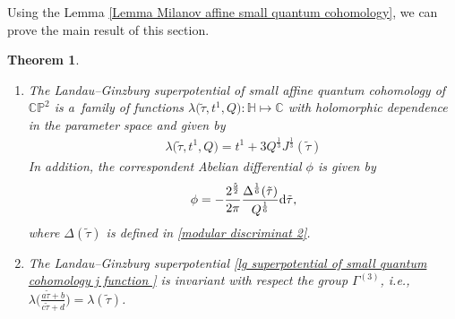 \documentclass[pdftex]{sigma}
\numberwithin{equation}{section}
\newtheorem{Theorem}{Theorem}[section]
\begin{document}
Using the Lemma \ref{Lemma Milanov affine small quantum cohomology}, we can prove the main result of this section.

\begin{Theorem}\quad
\begin{enumerate}\itemsep=0pt
\item[$(1)$]
The Landau--Ginzburg superpotential of small affine quantum cohomology of $\mathbb{CP}^2$ is a~family of functions
$
\lambda\bigl(\tilde\tau, t^1, Q\bigr)\colon \mathbb{H} \mapsto \mathbb{C}
$
with holomorphic dependence in the parameter space 
 and given by
\begin{gather}\label{lg superpotential of small quantum cohomology j function }
\lambda\bigl(\tilde\tau, t^1, Q\bigr)=t^1+3Q^{\frac{1}{3}}J^{\frac{1}{3}}(\tilde\tau)
\end{gather}
 In addition, the correspondent Abelian differential $\phi$ is given by
\begin{gather}\label{small volume form 1}
\phi=-\frac{2^{\frac{5}{2}}}{2\pi}\frac{\Delta^{\frac{1}{6}}(\tilde\tau )}{Q^{\frac{1}{6}}}{\rm d}\tilde\tau,
\end{gather}
where $\Delta(\tilde\tau)$ is defined in \eqref{modular discriminat 2}.

\item[$(2)$] The Landau--Ginzburg superpotential \eqref{lg superpotential of small quantum cohomology j function } is invariant with respect the group $\Gamma^{(3)}$, i.e.,
$
\lambda\bigl(\frac{a\tilde\tau+b}{c\tilde\tau+d}\bigr)=\lambda(\tilde\tau)$.
\end{enumerate}
\end{Theorem}
\end{document}
